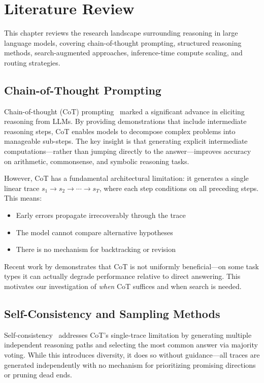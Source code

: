 \chapter{Literature Review}

This chapter reviews the research landscape surrounding reasoning in large language models, covering chain-of-thought prompting, structured reasoning methods, search-augmented approaches, inference-time compute scaling, and routing strategies.

\section{Chain-of-Thought Prompting}

Chain-of-thought (CoT) prompting~\citep{wei2022chain} marked a significant advance in eliciting reasoning from LLMs. By providing demonstrations that include intermediate reasoning steps, CoT enables models to decompose complex problems into manageable sub-steps. The key insight is that generating explicit intermediate computations---rather than jumping directly to the answer---improves accuracy on arithmetic, commonsense, and symbolic reasoning tasks.

However, CoT has a fundamental architectural limitation: it generates a single linear trace $s_1 \rightarrow s_2 \rightarrow \cdots \rightarrow s_T$, where each step conditions on all preceding steps. This means:
\begin{itemize}
\item Early errors propagate irrecoverably through the trace
\item The model cannot compare alternative hypotheses
\item There is no mechanism for backtracking or revision
\end{itemize}

Recent work by \cite{meincke2025cot} demonstrates that CoT is not uniformly beneficial---on some task types it can actually degrade performance relative to direct answering. This motivates our investigation of \emph{when} CoT suffices and when search is needed.

\section{Self-Consistency and Sampling Methods}

Self-consistency~\citep{wang2022self} addresses CoT's single-trace limitation by generating multiple independent reasoning paths and selecting the most common answer via majority voting. While this introduces diversity, it does so without guidance---all traces are generated independently with no mechanism for prioritizing promising directions or pruning dead ends.

